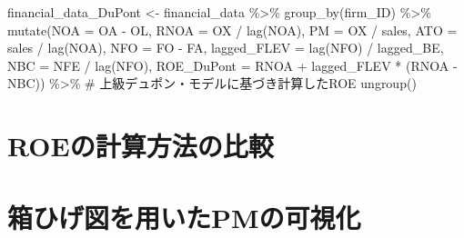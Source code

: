 \documentclass[
  letterpaper,
  DIV=11,
  numbers=noendperiod]{scrreprt}
\newenvironment{Shaded}{\begin{snugshade}}{\end{snugshade}}
\newcommand{\AttributeTok}[1]{\textcolor[rgb]{0.40,0.45,0.13}{#1}}
\newcommand{\CommentTok}[1]{\textcolor[rgb]{0.37,0.37,0.37}{#1}}
\newcommand{\FunctionTok}[1]{\textcolor[rgb]{0.28,0.35,0.67}{#1}}
\newcommand{\NormalTok}[1]{\textcolor[rgb]{0.00,0.23,0.31}{#1}}
\newcommand{\OtherTok}[1]{\textcolor[rgb]{0.00,0.23,0.31}{#1}}
\newcommand{\SpecialCharTok}[1]{\textcolor[rgb]{0.37,0.37,0.37}{#1}}
\begin{document}
\begin{Shaded}
\begin{Highlighting}[]
\NormalTok{financial\_data\_DuPont }\OtherTok{\textless{}{-}}\NormalTok{ financial\_data }\SpecialCharTok{\%\textgreater{}\%} 
  \FunctionTok{group\_by}\NormalTok{(firm\_ID) }\SpecialCharTok{\%\textgreater{}\%}
  \FunctionTok{mutate}\NormalTok{(}\AttributeTok{NOA =}\NormalTok{ OA }\SpecialCharTok{{-}}\NormalTok{ OL,}
         \AttributeTok{RNOA =}\NormalTok{ OX }\SpecialCharTok{/} \FunctionTok{lag}\NormalTok{(NOA),}
         \AttributeTok{PM =}\NormalTok{ OX }\SpecialCharTok{/}\NormalTok{ sales,}
         \AttributeTok{ATO =}\NormalTok{ sales }\SpecialCharTok{/} \FunctionTok{lag}\NormalTok{(NOA),}
         \AttributeTok{NFO =}\NormalTok{ FO }\SpecialCharTok{{-}}\NormalTok{ FA,}
         \AttributeTok{lagged\_FLEV =} \FunctionTok{lag}\NormalTok{(NFO) }\SpecialCharTok{/}\NormalTok{ lagged\_BE,}
         \AttributeTok{NBC =}\NormalTok{ NFE }\SpecialCharTok{/} \FunctionTok{lag}\NormalTok{(NFO),}
         \AttributeTok{ROE\_DuPont =}\NormalTok{ RNOA }\SpecialCharTok{+}\NormalTok{ lagged\_FLEV }\SpecialCharTok{*}\NormalTok{ (RNOA }\SpecialCharTok{{-}}\NormalTok{ NBC)) }\SpecialCharTok{\%\textgreater{}\%} \CommentTok{\# 上級デュポン・モデルに基づき計算したROE}
  \FunctionTok{ungroup}\NormalTok{()}
\end{Highlighting}
\end{Shaded}

\section{ROEの計算方法の比較}\label{roeux306eux8a08ux7b97ux65b9ux6cd5ux306eux6bd4ux8f03}

\begin{Shaded}
\end{Shaded}

\section{箱ひげ図を用いたPMの可視化}\label{ux7bb1ux3072ux3052ux56f3ux3092ux7528ux3044ux305fpmux306eux53efux8996ux5316}
\end{document}
